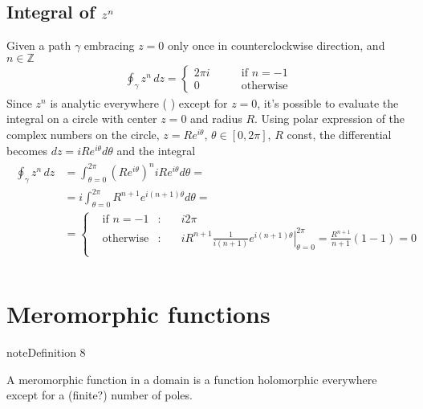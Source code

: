 \documentclass[letterpaper,10pt,english]{jupyterBook}
\begin{document}
\subsection{Integral of \protect\(z^n\protect\)}
\label{\detokenize{ch/complex/analysis:integral-of-z-n}}\label{\detokenize{ch/complex/analysis:complex-analysis-useful-int-path-independence-z-n}}
\sphinxAtStartPar
Given a path \(\gamma\) embracing \(z=0\) only once in counter\sphinxhyphen{}clockwise direction, and \(n \in \mathbb{Z}\)
\begin{equation*}
\begin{split}\oint_{\gamma} z^n \, dz = \left\{ \begin{aligned}  2 \pi i & \qquad \text{if $n = -1$} \\ 0 & \qquad \text{otherwise} \end{aligned} \right.\end{split}
\end{equation*}
\sphinxAtStartPar
Since \(z^n\) is analytic everywhere ( ) except for \(z=0\), it’s possible to evaluate the integral on a circle with center \(z=0\) and radius \(R\). Using polar expression of the complex numbers on the circle, \(z = R e^{i \theta}\), \(\theta \in [0, 2 \pi]\), \(R\) const, the differential becomes \(dz = i R e^{i \theta} d \theta\) and the integral
\begin{equation*}
\begin{split}\begin{aligned}
\oint_{\gamma} z^n \, dz
  & = \int_{\theta=0}^{2 \pi} \left( R e^{i\theta}\right)^n i R e^{i \theta} d \theta = \\
  & = i \int_{\theta=0}^{2 \pi} R^{n+1} e^{i (n+1) \theta} d \theta = \\
  & = \left\{ \begin{aligned}
    & \text{if $n=-1$} & : & \quad  i 2 \pi \\
    & \text{otherwise} & : & \quad  i R^{n+1} \frac{1}{i(n+1)} \left.e^{i(n+1)\theta}\right|_{\theta=0}^{2\pi} = \frac{R^{n+1}}{n+1} ( 1 - 1 ) = 0 \\
  \end{aligned} \right.\\
\end{aligned}\end{split}
\end{equation*}

\section{Meromorphic functions}
\label{\detokenize{ch/complex/analysis:meromorphic-functions}}\label{\detokenize{ch/complex/analysis:complex-analysis-mero-fun}}\label{ch/complex/analysis:definition-1}
\begin{sphinxadmonition}{note}{Definition 8}



\sphinxAtStartPar
A meromorphic function in a domain is a function holomorphic everywhere except for a (finite?) number of poles. 
\end{sphinxadmonition}
\end{document}
